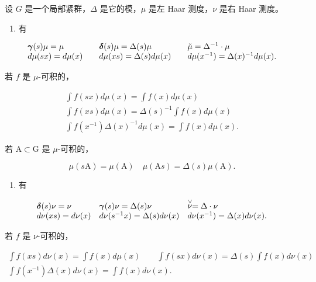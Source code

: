 
设 \(G\) 是一个局部紧群，\(\Delta\) 是它的模，\(\mu\) 是左 Haar 测度，\(\nu\) 是右 Haar 测度。

\begin{enumerate}
\def\labelenumi{\arabic{enumi})}
\tightlist
\item
  有
\end{enumerate}

\[
\begin{array}{l l l l} \boldsymbol {\gamma} (s) \mu = \mu & \quad \boldsymbol {\delta} (s) \mu = \Delta (s) \mu & \quad \check {\mu} = \Delta^ {- 1} \cdot \mu \\ d \mu (s x) = d \mu (x) & \quad d \mu (x s) = \Delta (s)   d \mu (x) & \quad d \mu (x ^ {- 1}) = \Delta (x) ^ {- 1}   d \mu (x). \end{array}
\]

若 \(f\) 是 \(\mu\)-可积的，

\[
\begin{array}{c} \int f (s x) d \mu (x) = \int f (x) d \mu (x) \\ \int f (x s) d \mu (x) = \Delta (s) ^ {- 1} \int f (x) d \mu (x) \\ \int f (x ^ {- 1}) \Delta (x) ^ {- 1} d \mu (x) = \int f (x) d \mu (x). \end{array}
\]

若 \(\mathrm{A}\subset \mathrm{G}\) 是 \(\mu\)-可积的，

\[
\mu (s \mathrm{A}) = \mu (\mathrm{A}) \quad \mu (\mathrm{A} s) = \Delta (s) \mu (\mathrm{A}).
\]

\begin{enumerate}
\def\labelenumi{\arabic{enumi})}
\setcounter{enumi}{1}
\tightlist
\item
  有
\end{enumerate}

\[
\begin{array}{l l l l} \boldsymbol {\delta} (s) \nu = \nu & \boldsymbol {\gamma} (s) \nu = \Delta (s) \nu & \stackrel {{\vee}} {{\nu}} = \Delta \cdot \nu \\ d \nu (x s) = d \nu (x) & d \nu (s ^ {- 1} x) = \Delta (s)   d \nu (x) & d \nu (x ^ {- 1}) = \Delta (x)   d \nu (x). \end{array}
\]

若 \(f\) 是 \(\nu\)-可积的，

\[
\begin{array}{c} \int f (x s) d \nu (x) = \int f (x) d \mu (x) \qquad \int f (s x) d \nu (x) = \Delta (s) \int f (x) d \nu (x) \\ \int f (x ^ {- 1}) \Delta (x) d \nu (x) = \int f (x) d \nu (x). \end{array}
\]

